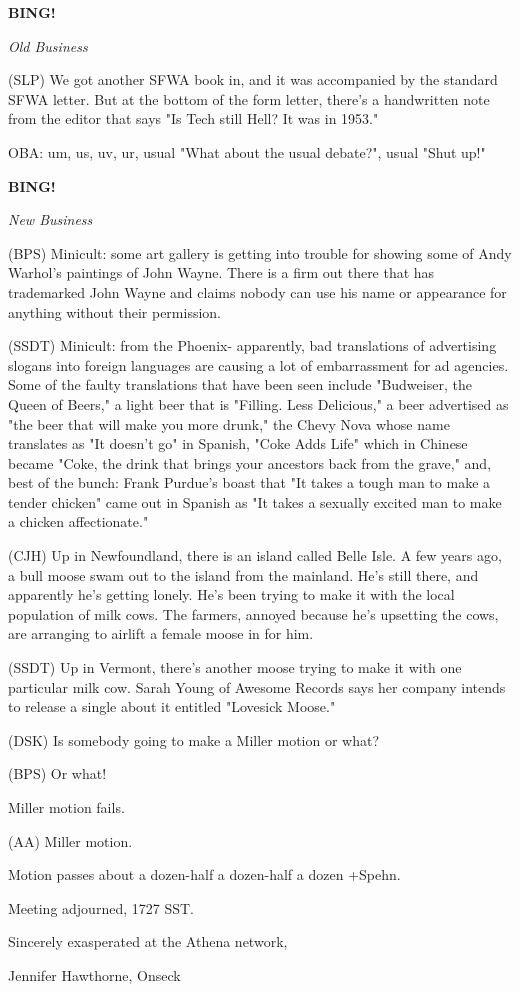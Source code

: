 \documentclass[12pt]{article}
\newcommand{\bing}{{\bf BING!} }
\newcommand{\goto}[1]{\bing \vskip 12pt \centerline{{\em{#1}}}}
\begin{document}
\goto{Old Business}

(SLP) We got another SFWA book in, and it was accompanied by the standard SFWA letter. But at the bottom of the form letter, there's a handwritten note from the editor that says "Is Tech still Hell? It was in 1953."

OBA: um, us, uv, ur, usual "What about the usual debate?", usual "Shut up!"

\goto{New Business}

(BPS) Minicult: some art gallery is getting into trouble for showing some of Andy Warhol's paintings of John Wayne. There is a firm out there that has trademarked John Wayne and claims nobody can use his name or appearance for anything without their permission.

(SSDT) Minicult: from the Phoenix- apparently, bad translations of advertising slogans into foreign languages are causing a lot of embarrassment for ad agencies. Some of the faulty translations that have been seen include "Budweiser, the Queen of Beers," a light beer that is "Filling. Less Delicious," a beer advertised as "the beer that will make you more drunk," the Chevy Nova whose name translates as "It doesn't go" in Spanish, "Coke Adds Life" which in Chinese became "Coke, the drink that brings your ancestors back from the grave," and, best of the bunch: Frank Purdue's boast that "It takes a tough man to make a tender chicken" came out in Spanish as "It takes a sexually excited man to make a chicken affectionate."

(CJH) Up in Newfoundland, there is an island called Belle Isle. A few years ago, a bull moose swam out to the island from the mainland. He's still there, and apparently he's getting lonely. He's been trying to make it with the local population of milk cows. The farmers, annoyed because he's upsetting the cows, are arranging to airlift a female moose in for him.

(SSDT) Up in Vermont, there's another moose trying to make it with one particular milk cow. Sarah Young of Awesome Records says her company intends to release a single about it entitled "Lovesick Moose."

(DSK) Is somebody going to make a Miller motion or what?

(BPS) Or what!

Miller motion fails.

(AA) Miller motion.

Motion passes about a dozen-half a dozen-half a dozen +Spehn.

\vspace{12pt}

\noindent
Meeting adjourned, 1727 SST.

\vspace{18pt}

\centerline{Sincerely exasperated at the Athena network,}
\centerline{Jennifer Hawthorne, Onseck}
\end{document}

